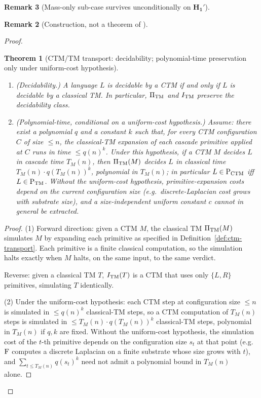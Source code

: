 \documentclass[11pt, a4paper]{amsart}
\newtheorem{theorem}{Theorem}[section]
\theoremstyle{definition}
\newtheorem{remark}[theorem]{Remark}
\newcommand{\TM}{{\rm TM}}
\begin{document}
\begin{remark}[Mass-only sub-case survives unconditionally on $\mathbf{H_1'}$]
\begin{remark}[Construction, not a theorem of \cite{CascadeEmbeddings}]
\begin{proof}
\begin{theorem}[CTM/TM transport: decidability; polynomial-time preservation only under uniform-cost hypothesis]
\label{thm:ctm-tm-transport}
\begin{enumerate}
\item (Decidability.) A language $L$ is decidable by a CTM if and
  only if $L$ is decidable by a classical TM. In particular,
  $\Pi_{\TM}$ and $I_{\TM}$ preserve the decidability class.
\item (Polynomial-time, \emph{conditional on a uniform-cost
  hypothesis}.) Assume: there exist a polynomial $q$ and a
  constant $k$ such that, for every CTM configuration $C$ of size
  $\leq n$, the classical-TM expansion of each cascade primitive
  applied at $C$ runs in time $\leq q(n)^k$. Under this hypothesis,
  if a CTM $M$ decides $L$ in cascade time $T_M(n)$, then
  $\Pi_{\TM}(M)$ decides $L$ in classical time $T_M(n) \cdot
  q(T_M(n))^k$, polynomial in $T_M(n)$; in particular $L \in
  \mathrm{P}_{\rm CTM}$ iff $L \in \mathrm{P}_{\rm TM}$. Without
  the uniform-cost hypothesis, primitive-expansion costs depend on
  the current configuration size (e.g.\ discrete-Laplacian cost
  grows with substrate size), and a size-independent uniform
  constant $c$ cannot in general be extracted.
\end{enumerate}
\end{theorem}

\begin{proof}
(1) Forward direction: given a CTM $M$, the classical TM
$\Pi_{\TM}(M)$ simulates $M$ by expanding each primitive as
specified in Definition~\ref{def:ctm-transport}. Each primitive is
a finite classical computation, so the simulation halts exactly
when $M$ halts, on the same input, to the same verdict.

Reverse: given a classical TM $T$, $I_{\TM}(T)$ is a CTM that uses
only $\{L, R\}$ primitives, simulating $T$ identically.

(2) Under the uniform-cost hypothesis: each CTM step at
configuration size $\leq n$ is simulated in $\leq q(n)^k$
classical-TM steps, so a CTM computation of $T_M(n)$ steps is
simulated in $\leq T_M(n) \cdot q(T_M(n))^k$ classical-TM steps,
polynomial in $T_M(n)$ if $q, k$ are fixed. Without the
uniform-cost hypothesis, the simulation cost of the $t$-th
primitive depends on the configuration size $s_t$ at that point
(e.g.\ $\rm F$ computes a discrete Laplacian on a finite substrate
whose size grows with $t$), and $\sum_{t \leq T_M(n)} q(s_t)^k$
need not admit a polynomial bound in $T_M(n)$ alone.
\end{proof}


\end{proof}
\end{remark}
\end{remark}
\end{document}
